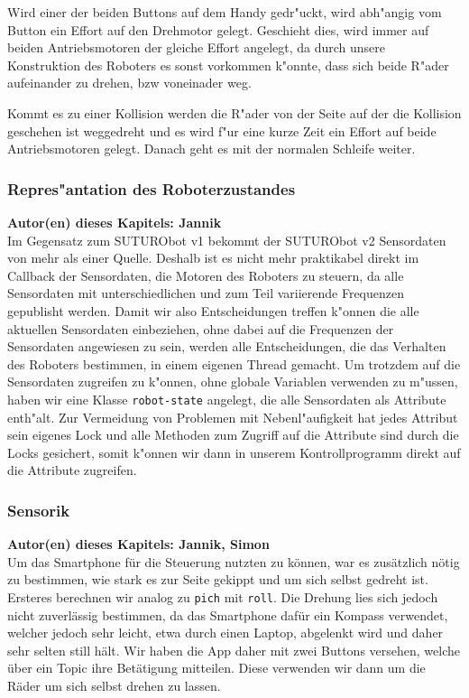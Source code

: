 \documentclass[8pt]{article}
\newcommand{\secauthor}[1]{\textbf{Autor(en) dieses Kapitels: {#1}}\\}
\begin{document}
Wird einer der beiden Buttons auf dem Handy gedr"uckt, wird abh"angig vom Button ein Effort auf den Drehmotor gelegt. Geschieht dies, wird immer auf beiden Antriebsmotoren der gleiche Effort angelegt, da durch unsere Konstruktion des Roboters es sonst vorkommen k"onnte, dass sich beide R"ader aufeinander zu drehen, bzw voneinader weg.
  
Kommt es zu einer Kollision werden die R"ader von der Seite auf der die Kollision geschehen ist weggedreht und es wird f"ur eine kurze Zeit ein Effort auf beide Antriebsmotoren gelegt. Danach geht es mit der normalen Schleife weiter.

 
\subsubsection{Repres"antation des Roboterzustandes}
\secauthor{Jannik}
Im Gegensatz zum SUTURObot v1 bekommt der SUTURObot v2 Sensordaten von mehr als einer Quelle. Deshalb ist es nicht mehr praktikabel direkt im Callback der Sensordaten, die Motoren des Roboters zu steuern, da alle Sensordaten mit unterschiedlichen und zum Teil variierende Frequenzen gepublisht werden. Damit wir also Entscheidungen treffen k"onnen die alle aktuellen Sensordaten einbeziehen, ohne dabei auf die Frequenzen der Sensordaten angewiesen zu sein, werden alle Entscheidungen, die das Verhalten des Roboters bestimmen, in einem eigenen Thread gemacht. Um trotzdem auf die Sensordaten zugreifen zu k"onnen, ohne globale Variablen verwenden zu m"ussen, haben wir eine Klasse \texttt{robot-state} angelegt, die alle Sensordaten als Attribute enth"alt. Zur Vermeidung von Problemen mit Nebenl"aufigkeit hat jedes Attribut sein eigenes Lock und alle Methoden zum Zugriff auf die Attribute sind durch die Locks gesichert, somit k"onnen wir dann in unserem Kontrollprogramm direkt auf die Attribute zugreifen. 

\subsubsection{Sensorik} 
\secauthor{Jannik, Simon}
Um das Smartphone für die Steuerung nutzten zu können, war es zusätzlich nötig zu bestimmen, wie stark es zur Seite gekippt und um sich selbst gedreht ist. Ersteres berechnen wir analog zu \texttt{pich} mit \texttt{roll}. Die Drehung lies sich jedoch nicht zuverlässig bestimmen, da das Smartphone dafür ein Kompass verwendet, welcher jedoch sehr leicht, etwa durch einen Laptop, abgelenkt wird und daher sehr selten still hält. Wir haben die App daher mit zwei Buttons versehen, welche über ein Topic ihre Betätigung mitteilen. Diese verwenden wir dann um die Räder um sich selbst drehen zu lassen.
\end{document}
